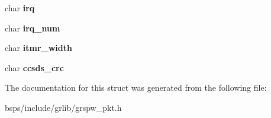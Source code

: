 \begin{DoxyCompactItemize}
char {\bfseries irq}
\item 
\mbox{\label{structgrspw__hw__sup_aa1ba191ebc91136e475fdf7d1dfaa0cd}} 
char {\bfseries irq\+\_\+num}
\item 
\mbox{\label{structgrspw__hw__sup_ab12da6984e32db7b617d70f2c0b5b0ae}} 
char {\bfseries itmr\+\_\+width}
\item 
\mbox{\label{structgrspw__hw__sup_abd53970ebe6f97680467b9365a7b8499}} 
char {\bfseries ccsds\+\_\+crc}
\end{DoxyCompactItemize}


The documentation for this struct was generated from the following file\+:\begin{DoxyCompactItemize}
\item 
bsps/include/grlib/grspw\+\_\+pkt.\+h\end{DoxyCompactItemize}
